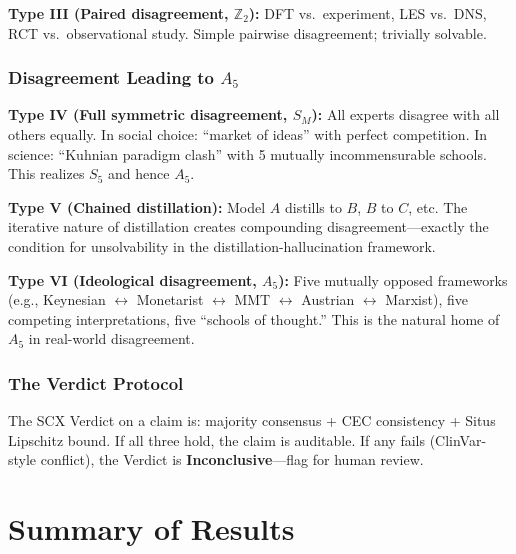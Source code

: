 \documentclass[12pt,a4paper]{article}
\theoremstyle{remark}
\begin{document}
\textbf{Type III (Paired disagreement, \(\mathbb{Z}_2\)):} DFT vs.\ experiment, LES vs.\ DNS, RCT vs.\ observational study. Simple pairwise disagreement; trivially solvable.

\subsubsection{Disagreement Leading to \(A_5\)}
\textbf{Type IV (Full symmetric disagreement, \(S_M\)):} All experts disagree with all others equally. In social choice: ``market of ideas'' with perfect competition. In science: ``Kuhnian paradigm clash'' with 5 mutually incommensurable schools. This realizes \(S_5\) and hence \(A_5\).

\textbf{Type V (Chained distillation):} Model \(A\) distills to \(B\), \(B\) to \(C\), etc. The iterative nature of distillation creates compounding disagreement---exactly the condition for unsolvability in the distillation-hallucination framework.

\textbf{Type VI (Ideological disagreement, \(A_5\)):} Five mutually opposed frameworks (e.g., Keynesian \(\leftrightarrow\) Monetarist \(\leftrightarrow\) MMT \(\leftrightarrow\) Austrian \(\leftrightarrow\) Marxist), five competing interpretations, five ``schools of thought.'' This is the natural home of \(A_5\) in real-world disagreement.

\subsubsection{The Verdict Protocol}
The SCX Verdict on a claim is: majority consensus + CEC consistency + Situs Lipschitz bound. If all three hold, the claim is auditable. If any fails (ClinVar-style conflict), the Verdict is \textbf{Inconclusive}---flag for human review.
\section{Summary of Results}
\end{document}
